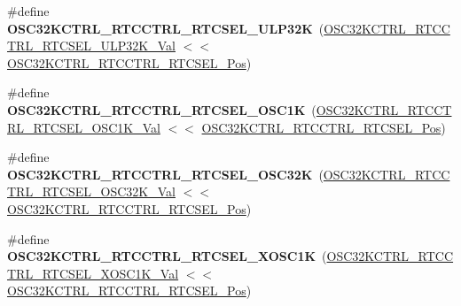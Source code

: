 \begin{DoxyCompactItemize}
\item 
\hypertarget{group___s_a_m_l21___o_s_c32_k_c_t_r_l_ga1030b2391e420452e82cc099bca18108}{}\#define {\bfseries O\+S\+C32\+K\+C\+T\+R\+L\+\_\+\+R\+T\+C\+C\+T\+R\+L\+\_\+\+R\+T\+C\+S\+E\+L\+\_\+\+U\+L\+P32\+K}~(\hyperlink{group___s_a_m_l21___o_s_c32_k_c_t_r_l_gae97e1489ab8d1f1a49d8e7e2ad8b7427}{O\+S\+C32\+K\+C\+T\+R\+L\+\_\+\+R\+T\+C\+C\+T\+R\+L\+\_\+\+R\+T\+C\+S\+E\+L\+\_\+\+U\+L\+P32\+K\+\_\+\+Val} $<$$<$ \hyperlink{group___s_a_m_l21___o_s_c32_k_c_t_r_l_gadcfbd528df699f49aa94aed33cfa1324}{O\+S\+C32\+K\+C\+T\+R\+L\+\_\+\+R\+T\+C\+C\+T\+R\+L\+\_\+\+R\+T\+C\+S\+E\+L\+\_\+\+Pos})\label{group___s_a_m_l21___o_s_c32_k_c_t_r_l_ga1030b2391e420452e82cc099bca18108}

\item 
\hypertarget{group___s_a_m_l21___o_s_c32_k_c_t_r_l_ga366744020e7a99f6c9ca3a154e67b00b}{}\#define {\bfseries O\+S\+C32\+K\+C\+T\+R\+L\+\_\+\+R\+T\+C\+C\+T\+R\+L\+\_\+\+R\+T\+C\+S\+E\+L\+\_\+\+O\+S\+C1\+K}~(\hyperlink{group___s_a_m_l21___o_s_c32_k_c_t_r_l_gab8e2a5382213b202bb22efed0e4a0da9}{O\+S\+C32\+K\+C\+T\+R\+L\+\_\+\+R\+T\+C\+C\+T\+R\+L\+\_\+\+R\+T\+C\+S\+E\+L\+\_\+\+O\+S\+C1\+K\+\_\+\+Val} $<$$<$ \hyperlink{group___s_a_m_l21___o_s_c32_k_c_t_r_l_gadcfbd528df699f49aa94aed33cfa1324}{O\+S\+C32\+K\+C\+T\+R\+L\+\_\+\+R\+T\+C\+C\+T\+R\+L\+\_\+\+R\+T\+C\+S\+E\+L\+\_\+\+Pos})\label{group___s_a_m_l21___o_s_c32_k_c_t_r_l_ga366744020e7a99f6c9ca3a154e67b00b}

\item 
\hypertarget{group___s_a_m_l21___o_s_c32_k_c_t_r_l_ga663794caa4dc6705f40cd635ac14d6af}{}\#define {\bfseries O\+S\+C32\+K\+C\+T\+R\+L\+\_\+\+R\+T\+C\+C\+T\+R\+L\+\_\+\+R\+T\+C\+S\+E\+L\+\_\+\+O\+S\+C32\+K}~(\hyperlink{group___s_a_m_l21___o_s_c32_k_c_t_r_l_ga257ca348d5901c8e4f56bc82a3d4e3db}{O\+S\+C32\+K\+C\+T\+R\+L\+\_\+\+R\+T\+C\+C\+T\+R\+L\+\_\+\+R\+T\+C\+S\+E\+L\+\_\+\+O\+S\+C32\+K\+\_\+\+Val} $<$$<$ \hyperlink{group___s_a_m_l21___o_s_c32_k_c_t_r_l_gadcfbd528df699f49aa94aed33cfa1324}{O\+S\+C32\+K\+C\+T\+R\+L\+\_\+\+R\+T\+C\+C\+T\+R\+L\+\_\+\+R\+T\+C\+S\+E\+L\+\_\+\+Pos})\label{group___s_a_m_l21___o_s_c32_k_c_t_r_l_ga663794caa4dc6705f40cd635ac14d6af}

\item 
\hypertarget{group___s_a_m_l21___o_s_c32_k_c_t_r_l_ga082a70fa1afabc485d1e05603757581a}{}\#define {\bfseries O\+S\+C32\+K\+C\+T\+R\+L\+\_\+\+R\+T\+C\+C\+T\+R\+L\+\_\+\+R\+T\+C\+S\+E\+L\+\_\+\+X\+O\+S\+C1\+K}~(\hyperlink{group___s_a_m_l21___o_s_c32_k_c_t_r_l_ga14454b0efb7d20c1a14a46ebc86ff167}{O\+S\+C32\+K\+C\+T\+R\+L\+\_\+\+R\+T\+C\+C\+T\+R\+L\+\_\+\+R\+T\+C\+S\+E\+L\+\_\+\+X\+O\+S\+C1\+K\+\_\+\+Val} $<$$<$ \hyperlink{group___s_a_m_l21___o_s_c32_k_c_t_r_l_gadcfbd528df699f49aa94aed33cfa1324}{O\+S\+C32\+K\+C\+T\+R\+L\+\_\+\+R\+T\+C\+C\+T\+R\+L\+\_\+\+R\+T\+C\+S\+E\+L\+\_\+\+Pos})\label{group___s_a_m_l21___o_s_c32_k_c_t_r_l_ga082a70fa1afabc485d1e05603757581a}


\end{DoxyCompactItemize}

